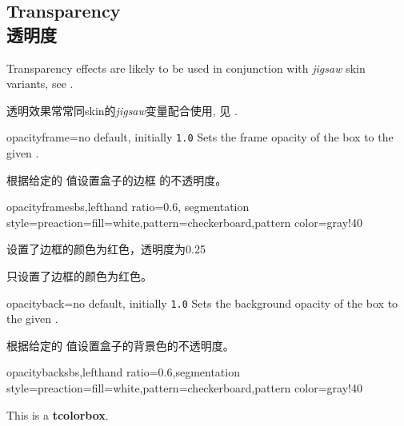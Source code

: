 \subsection{Transparency\\透明度}

\begin{marker}
Transparency effects are likely to be used in conjunction with \emph{jigsaw}
skin variants, see .

透明效果常常同skin的\emph{jigsaw}变量配合使用, 见 .
\end{marker}

\begin{docTcbKey}{opacityframe}{=}{no default, initially \texttt{1.0}}
Sets the frame opacity of the box to the given .

根据给定的  值设置盒子的边框%
的不透明度。
\begin{exdispExample*}{opacityframe}{sbs,lefthand ratio=0.6,
segmentation style={preaction={fill=white},pattern=checkerboard,pattern color=gray!40}
}
\begin{tcolorbox}[opacityframe=0.25
,title=设置了边框的颜色和透明度,
colframe=red]
设置了边框的颜色为红色，透明度为0.25
\end{tcolorbox}
\begin{tcolorbox}[colframe=red
,title=设置了边框的颜色]
只设置了边框的颜色为红色。
\end{tcolorbox}
\end{exdispExample*}
\end{docTcbKey}


\begin{docTcbKey}{opacityback}{=}{no default, initially \texttt{1.0}}
Sets the background opacity of the box to the given .

根据给定的  值设置盒子的背景色的不透明度。
\begin{exdispExample*}{opacityback}{sbs,lefthand ratio=0.6,segmentation style={preaction={fill=white},pattern=checkerboard,pattern color=gray!40}}
\begin{tcolorbox}[standard jigsaw,colframe=red,
opacityframe=0.5, opacityback=0.5]
This is a \textbf{tcolorbox}.
\end{tcolorbox}
\end{exdispExample*}
\end{docTcbKey}

